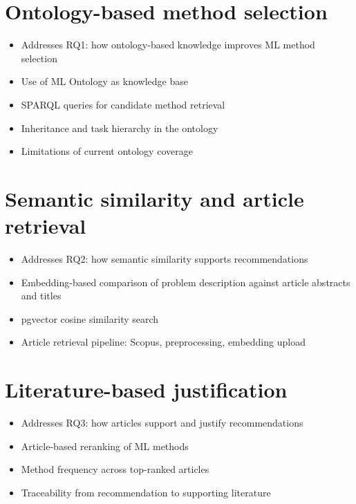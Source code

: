 \label{ch:research-approach}

\section{Ontology-based method selection}

\begin{itemize}
    \item Addresses RQ1: how ontology-based knowledge improves ML method selection
    \item Use of ML Ontology as knowledge base
    \item SPARQL queries for candidate method retrieval
    \item Inheritance and task hierarchy in the ontology
    \item Limitations of current ontology coverage
\end{itemize}

\section{Semantic similarity and article retrieval}

\begin{itemize}
    \item Addresses RQ2: how semantic similarity supports recommendations
    \item Embedding-based comparison of problem description against article abstracts and titles
    \item pgvector cosine similarity search
    \item Article retrieval pipeline: Scopus, preprocessing, embedding upload
\end{itemize}

\section{Literature-based justification}

\begin{itemize}
    \item Addresses RQ3: how articles support and justify recommendations
    \item Article-based reranking of ML methods
    \item Method frequency across top-ranked articles
    \item Traceability from recommendation to supporting literature
\end{itemize}

